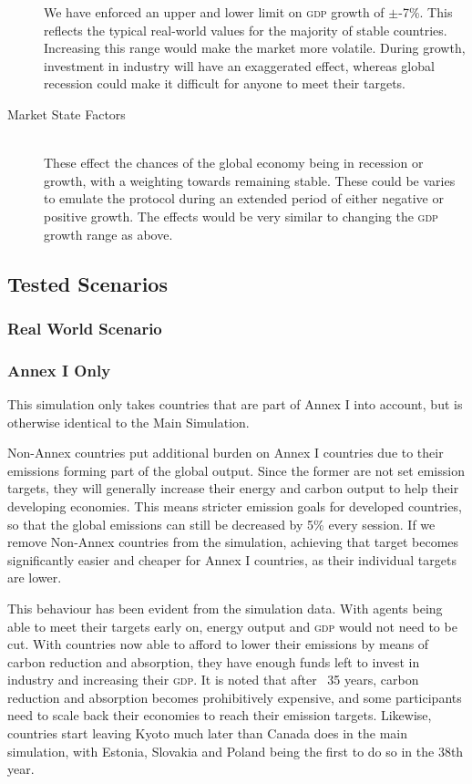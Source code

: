 \begin{description}
We have enforced an upper and lower limit on \textsc{gdp} growth of $\pm$-7\%. This reflects the typical real-world values for the majority of stable countries. Increasing this range would make the market more volatile. During growth, investment in industry will have an exaggerated effect, whereas global recession could make it difficult for anyone to meet their targets.

\item[Market State Factors] \hfill \\

These effect the chances of the global economy being in recession or growth, with a weighting towards remaining stable. These could be varies to emulate the protocol during an extended period of either negative or positive growth. The effects would be very similar to changing the \textsc{gdp} growth range as above.
\end{description}

\subsection{Tested Scenarios}

%
%

\subsubsection{Real World Scenario}



\subsubsection{Annex I Only}

This simulation only takes countries that are part of Annex I into account, but is otherwise identical to the Main Simulation.

Non-Annex countries put additional burden on Annex I countries due to their emissions forming part of the global output. Since the former are not set emission targets, they will generally increase their energy and carbon output to help their developing economies. This means stricter emission goals for developed countries, so that the global emissions can still be decreased by 5\% every session. If we remove Non-Annex countries from the simulation, achieving that target becomes significantly easier and cheaper for Annex I countries, as their individual targets are lower.

This behaviour has been evident from the simulation data. With agents being able to meet their targets early on, energy output and \textsc{gdp} would not need to be cut. With countries now able to afford to lower their emissions by means of carbon reduction and absorption, they have enough funds left to invest in industry and increasing their \textsc{gdp}. It is noted that after ~35 years, carbon reduction and absorption becomes prohibitively expensive, and some participants need to scale back their economies to reach their emission targets. Likewise, countries start leaving Kyoto much later than Canada does in the main simulation, with Estonia, Slovakia and Poland being the first to do so in the 38th year.

